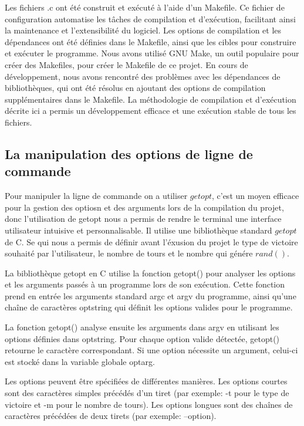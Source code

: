 \documentclass[a4paper]{article}
\begin{document}
Les fichiers .c  ont été construit et exécuté à l'aide d'un Makefile. Ce fichier de configuration automatise les tâches de compilation et d'exécution, facilitant ainsi la maintenance et l'extensibilité du logiciel. Les options de compilation et les dépendances ont été définies dans le Makefile, ainsi que les cibles pour construire et exécuter le programme. Nous avons utilisé GNU Make, un outil populaire pour créer des Makefiles, pour créer le Makefile de ce projet. En cours de développement, nous avons rencontré des problèmes avec les dépendances de bibliothèques, qui ont été résolus en ajoutant des options de compilation supplémentaires dans le Makefile. La méthodologie de compilation et d'exécution décrite ici a permis un développement efficace et une exécution stable de tous les fichiers.

\subsection{La manipulation des options de ligne de commande}


Pour manipuler la ligne de commande on a utiliser $getopt$, c'est un moyen efficace pour la gestion des optiosn et des arguments lors de la compilation du projet, donc l'utilisation de getopt nous a permis de rendre le terminal une interface utilisateur intuisive et personnalisable. Il utilise une bibliothèque standard $getopt$ de C. Se qui nous a permis de définir avant l'éxusion du projet le type de victoire souhaité par l'utilisateur, le nombre de tours et le nombre qui génére $rand()$. 

La bibliothèque getopt en C utilise la fonction getopt() pour analyser les options et les arguments passés à un programme lors de son exécution. Cette fonction prend en entrée les arguments standard argc et argv du programme, ainsi qu'une chaîne de caractères optstring qui définit les options valides pour le programme.

La fonction getopt() analyse ensuite les arguments dans argv en utilisant les options définies dans optstring. Pour chaque option valide détectée, getopt() retourne le caractère correspondant. Si une option nécessite un argument, celui-ci est stocké dans la variable globale optarg.

Les options peuvent être spécifiées de différentes manières. Les options courtes sont des caractères simples précédés d'un tiret (par exemple: -t pour le type de victoire et -m pour le nombre de tours). Les options longues sont des chaînes de caractères précédées de deux tirets (par exemple: --option).
\end{document}
